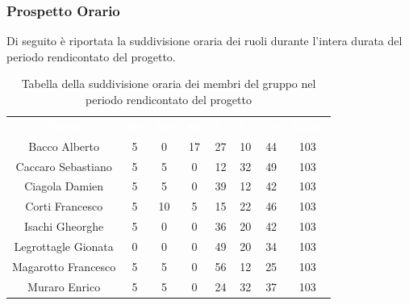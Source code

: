 \subsubsection{Prospetto Orario}
Di seguito è riportata la suddivisione oraria dei ruoli durante l'intera durata del periodo rendicontato del progetto.


\begin{table}[H]	
	\begin{center}
	    \begin{tabular}{cccccccc}
			\rowcolor{greySWEight}
			\textcolor{white}{\textbf{Nome}} & \textcolor{white}{\textbf{Re}} & \textcolor{white}{\textbf{Am}} & \textcolor{white}{\textbf{An}} & \textcolor{white}{\textbf{Pj}} & \textcolor{white}{\textbf{Pr}} & \textcolor{white}{\textbf{Ve}} & \textcolor{white}{\textbf{Totale}}
			\\			

			Bacco Alberto & 5 & 0 & 17 & 27 & 10 & 44 & 103 \\
			Caccaro Sebastiano & 5 & 5 & 0 & 12 & 32 & 49 & 103 \\
			Ciagola Damien & 5 & 5 & 0 & 39 & 12 & 42 & 103 \\
			Corti Francesco & 5 & 10 & 5 & 15 & 22 & 46 & 103 \\
			Isachi Gheorghe & 5 & 0 & 0 & 36 & 20 & 42 & 103 \\
			Legrottagle Gionata & 0 & 0 & 0 & 49 & 20 & 34 & 103 \\
			Magarotto Francesco & 5 & 5 & 0 & 56 & 12 & 25 & 103 \\
			Muraro Enrico & 5 & 5 & 0 & 24 & 32 & 37 & 103 \\

			\end{tabular}
	    \caption{Tabella della suddivisione oraria dei membri del gruppo nel periodo rendicontato del progetto} \label{tab:tabellaPersoneTotale} 
	\end{center}
\end{table}

